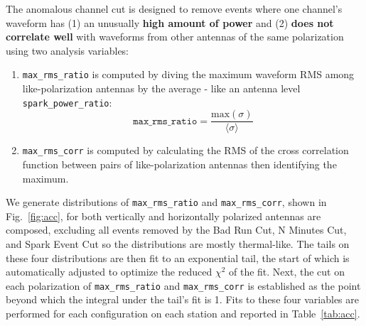     The anomalous channel cut is designed to remove events where one channel's waveform has (1) an unusually \textbf{high amount of power} and (2) \textbf{does not correlate well} with waveforms from other antennas of the same polarization using two analysis variables:
    \begin{enumerate}
      \item \texttt{max\_rms\_ratio} is computed by diving the maximum waveform RMS among like-polarization antennas by the average - like an antenna level \texttt{spark\_power\_ratio}:
      \begin{equation}
        \texttt{max\_rms\_ratio} = \frac{ \text{max}(\sigma) }{ \langle \sigma \rangle }
      \end{equation}
      \item \texttt{max\_rms\_corr} is computed by calculating the RMS of the cross correlation function between pairs of like-polarization antennas then identifying the maximum.
    \end{enumerate}
    We generate distributions of \texttt{max\_rms\_ratio} and \texttt{max\_rms\_corr}, shown in Fig.~\ref{fig:acc}, for both vertically and horizontally polarized antennas are composed, excluding all events removed by the Bad Run Cut, N Minutes Cut, and Spark Event Cut so the distributions are mostly thermal-like.
    The tails on these four distributions are then fit to an exponential tail, the start of which is automatically adjusted to optimize the reduced $\chi^2$ of the fit.
    Next, the cut on each polarization of \texttt{max\_rms\_ratio} and \texttt{max\_rms\_corr} is established as the point beyond which the integral under the tail's fit is 1. 
    Fits to these four variables are performed for each configuration on each station and reported in Table~\ref{tab:acc}. 

